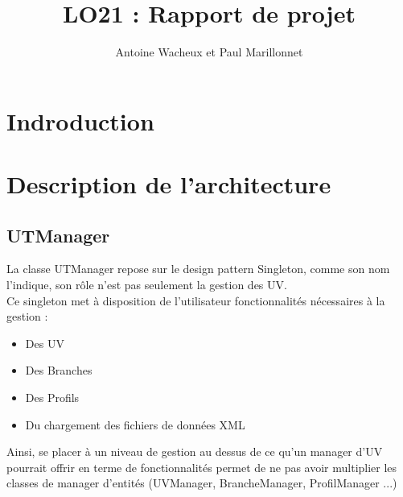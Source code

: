 \documentclass[a4paper,10pt,french]{report}
\begin{document}
\author{Antoine Wacheux et Paul Marillonnet}
\title{LO21 : Rapport de projet}\maketitle

\tableofcontents



\section*{Indroduction}\label{sec:Introduction}



\section{Description de l'architecture}\label{sec:I}



	\subsection{UTManager}\label{subsec:IA}
	
	La classe UTManager repose sur le design pattern Singleton, comme son nom l'indique, son rôle n'est pas seulement la gestion des UV. \\
	Ce singleton met à disposition de l'utilisateur fonctionnalités nécessaires à la gestion :
	\begin{itemize}
	\item Des UV
	\item Des Branches
	\item Des Profils
	\item Du chargement des fichiers de données XML	
	\end{itemize}
	Ainsi, se placer à un niveau de gestion au dessus de ce qu'un manager d'UV pourrait offrir en terme de fonctionnalités permet de ne pas avoir multiplier les classes de manager d'entités (UVManager, BrancheManager, ProfilManager ...)
	
		\subsubsection{}
			\paragraph{}
			\paragraph{}
\end{document}
